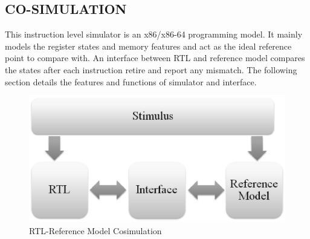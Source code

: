 \subsection {CO-SIMULATION}
This instruction level simulator is an x86/x86-64 programming model. It mainly models the register states and memory features and act as the ideal reference point to compare with. An interface between RTL and reference model compares the states after each instruction retire and report any mismatch. The following section details the features and functions of simulator and interface. 



\begin{figure}[H]
\centering
\includegraphics[width=4.5in]{./figures/interface.eps}
\caption{RTL-Reference Model Cosimulation} 
\label{fig:interface.eps}
\end{figure}






